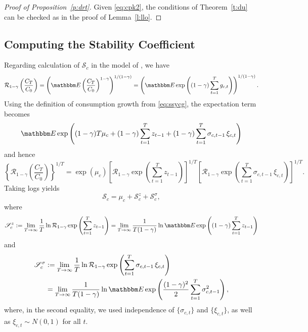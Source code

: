 \documentclass[12pt, reqno]{amsart}
\newcommand{\1}{\mathbbm 1}
\newcommand{\rR}{\mathcal R}
\newcommand{\sS}{\mathscr S}
\newcommand{\EE}{\mathbbm E}
\theoremstyle{plain}
\theoremstyle{definition}
\begin{document}
\begin{proof}[Proof of Proposition~\ref{p:drt}]
    Given \eqref{eq:cpk2}, the conditions of Theorem~\ref{t:du} can be
    checked as in the proof of Lemma~\ref{l:llo}.
\end{proof}


\subsection{Computing the Stability Coefficient}\label{s:comp_ssy}


Regarding calculation of $\sS_c$ in the model of
\cite{schorfheide2018identifying}, we have
%
\begin{equation*}
    \rR_{1-\gamma} \left( \frac{C_T}{C_0} \right)
    = \left( 
            \EE \left( \frac{C_T}{C_0} \right)^{1-\gamma}
        \right)^{1/(1-\gamma)}
    = \left( 
        \EE \exp\left( (1-\gamma) \sum_{t=1}^T g_{c,t} \right)
        \right)^{1/(1-\gamma)}.
\end{equation*}
%
Using the definition of consumption growth from \eqref{eq:ssycg}, the
expectation term becomes
%
\begin{equation*}
    \EE 
    \exp
    \left( (1-\gamma) T \mu_c
         + (1-\gamma) \sum_{t=1}^T z_{t-1} 
         + (1-\gamma) \sum_{t=1}^T \sigma_{c, t-1} \, \xi_{c, t}
     \right)
\end{equation*}
%
and hence 
%
\begin{equation*}
    \left\{ \rR_{1-\gamma} \left( \frac{C_T}{C_0} \right) \right\}^{1/T}
    = \exp(\mu_c)
        \left[
            \rR_{1-\gamma} \exp \left( \sum_{t=1}^T z_{t-1} \right)
        \right]^{1/T}
        \left[
            \rR_{1-\gamma} \exp \left( \sum_{t=1}^T \sigma_{c, t-1} \, \xi_{c, t} \right)
        \right]^{1/T}.
\end{equation*}
%
Taking logs yields
%
\begin{equation*}
    \sS_c 
    = \mu_c + \sS_c^z + \sS_c^\sigma,
\end{equation*}
%
where
%
\begin{equation*}
    \sS_c^z 
    := \lim_{T \to \infty} \frac{1}{T} \ln 
        \rR_{1-\gamma} \exp \left( \sum_{t=1}^T z_{t-1} \right)
        = \lim_{T \to \infty} \frac{1}{T(1-\gamma)} \ln 
        \EE \exp \left( (1-\gamma) \sum_{t=1}^T z_{t-1} \right)
\end{equation*}
%
and
%
\begin{align*}
    \sS_c^\sigma
    & := \lim_{T \to \infty} \frac{1}{T} \ln 
    \rR_{1-\gamma} \exp \left( \sum_{t=1}^T \sigma_{c, t-1} \, \xi_{c, t} \right)
    \\
    & = \lim_{T \to \infty} \frac{1}{T(1-\gamma)} \ln 
    \EE \exp 
       \left( 
           \frac{(1-\gamma)^2}{2} \sum_{t=1}^T \sigma_{c, t-1}^2
       \right),
\end{align*}
%
where, in the second
equality, we used independence of $\{ \sigma_{c, t} \}$ and $\{
\xi_{c,t}\}$, as well as $\xi_{c,t} \sim N(0,1)$ for all $t$.
\end{document}
